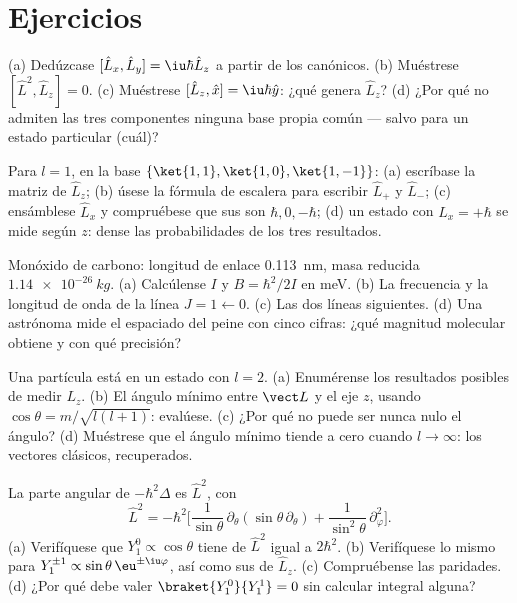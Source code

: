 \section{Ejercicios}

\begin{exercise}[$\star$]\label{exo:b3:quantum-angular-momentum:1}
(a) Dedúzcase $[\hat L_x, \hat L_y] = \iu\hbar\hat L_z$ a partir de los
 canónicos. (b) Muéstrese $[\hat L^2, \hat L_z] = 0$. (c)
Muéstrese $[\hat L_z, \hat x] = \iu\hbar\hat y$: ¿qué genera $\hat L_z$?
(d) ¿Por qué no admiten las tres componentes ninguna base propia común
--- salvo para un estado particular (cuál)?
\end{exercise}

\begin{exercise}[$\star$]\label{exo:b3:quantum-angular-momentum:2}
Para $l = 1$, en la base $\{\ket{1,1}, \ket{1,0}, \ket{1,-1}\}$:
(a) escríbase la matriz de $\hat L_z$; (b) úsese la fórmula de escalera para
escribir $\hat L_+$ y $\hat L_-$; (c) ensámblese $\hat L_x$ y compruébese que
sus  son $\hbar, 0, -\hbar$; (d) un estado con $L_x =
+\hbar$ se mide según $z$: dense las probabilidades de los tres
resultados.
\end{exercise}

\begin{exercise}[$\star$]\label{exo:b3:quantum-angular-momentum:3}
Monóxido de carbono: longitud de enlace \qty{0.113}{nm}, masa reducida
$\qty{1.14e-26}{kg}$. (a) Calcúlense $I$ y $B = \hbar^2/2I$ en meV.
(b) La frecuencia y la longitud de onda de la línea $J = 1 \leftarrow 0$.
(c) Las dos líneas siguientes. (d) Una astrónoma mide el espaciado del peine
con cinco cifras: ¿qué magnitud molecular obtiene y con qué
precisión?
\end{exercise}

\begin{exercise}[$\star$]\label{exo:b3:quantum-angular-momentum:4}
Una partícula está en un estado con $l = 2$. (a) Enumérense los resultados
posibles de medir $L_z$. (b) El ángulo mínimo entre $\vect L$ y el
eje $z$, usando $\cos\theta = m/\sqrt{l(l+1)}$: evalúese. (c) ¿Por qué
no puede ser nunca nulo el ángulo? (d) Muéstrese que el ángulo mínimo tiende
a cero cuando $l \to \infty$: los vectores clásicos, recuperados.
\end{exercise}

\begin{exercise}[$\star\star$]\label{exo:b3:quantum-angular-momentum:5}
La parte angular de $-\hbar^2\Delta$ es $\hat L^2$, con
\[
\hat L^2 = -\hbar^2\Big[\frac{1}{\sin\theta}\,\partial_\theta
(\sin\theta\,\partial_\theta) +
\frac{1}{\sin^2\theta}\,\partial_\varphi^2\Big] .
\]
(a) Verifíquese que $Y_1^0 \propto \cos\theta$ tiene  de
$\hat L^2$ igual a $2\hbar^2$. (b) Verifíquese lo mismo para $Y_1^{\pm1} \propto \sin\theta\,
\eu^{\pm\iu\varphi}$, así como sus  de $\hat L_z$. (c)
Compruébense las paridades. (d) ¿Por qué debe valer $\braket{Y_1^0}{Y_1^1} = 0$
sin calcular integral alguna?
\end{exercise}

